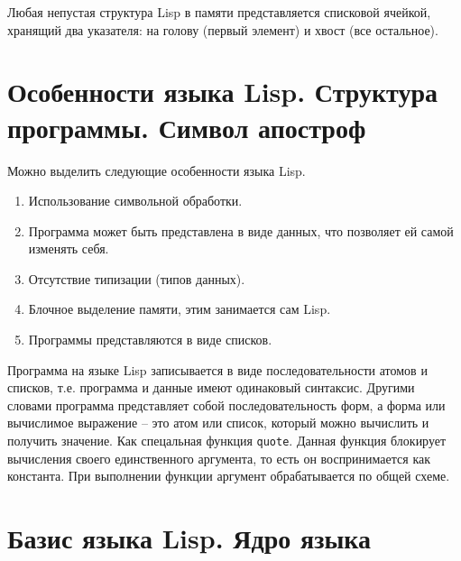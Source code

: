 \documentclass[14pt,a4paper]{scrreprt}
\begin{document}
Любая непустая структура Lisp в памяти представляется  списковой ячейкой, хранящий два указателя: на голову (первый элемент) и хвост (все остальное).
 

\section{Особенности языка Lisp. Структура программы. Символ апостроф}

Можно выделить следующие особенности языка Lisp.
\begin{enumerate}
	\item Использование символьной обработки.
	\item Программа может быть представлена в виде данных, что позволяет ей самой изменять себя.
	\item Отсутствие типизации (типов данных).
	\item Блочное выделение памяти, этим занимается сам Lisp.
	\item Программы представляются в виде списков.
\end{enumerate}

Программа на языке Lisp записывается в виде последовательности атомов и списков, т.е. программа и данные имеют одинаковый синтаксис. Другими словами программа представляет собой последовательность форм, а форма или вычислимое выражение -- это атом или список, который можно вычислить и получить значение. 
Как спецальная функция \texttt{quote}. Данная функция блокирует вычисления своего единственного аргумента, то есть он воспринимается как константа. При выполнении функции аргумент обрабатывается по общей схеме.

\section{Базис языка Lisp. Ядро языка}
\end{document}
